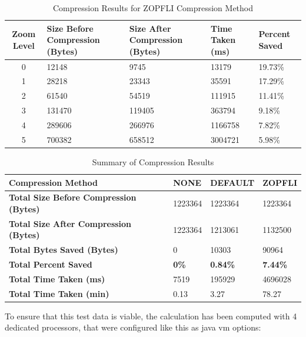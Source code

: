 \begin{table}[H]
    \centering
    \begin{tabularx}{\textwidth}{|c|X|X|X|X|}
        \hline
        \textbf{Zoom Level} & \textbf{Size Before Compression (Bytes)} & \textbf{Size After Compression (Bytes)} & \textbf{Time Taken (ms)} & \textbf{Percent Saved} \\ \hline
        0 & 12148 & 9745 & 13179 & 19.73\% \\ \hline
        1 & 28218 & 23343 & 35591 & 17.29\% \\ \hline
        2 & 61540 & 54519 & 111915 & 11.41\% \\ \hline
        3 & 131470 & 119405 & 363794 & 9.18\% \\ \hline
        4 & 289606 & 266976 & 1166758 & 7.82\% \\ \hline
        5 & 700382 & 658512 & 3004721 & 5.98\% \\ \hline
    \end{tabularx}
    \caption{Compression Results for ZOPFLI Compression Method}
    \label{tab:compression_zopfli}
\end{table}

\begin{table}[H]
    \centering
    \begin{tabular}{|p{7cm}|p{2.1cm}|p{2.1cm}|p{2.1cm}|}
        \hline
        \textbf{Compression Method} & \textbf{NONE} & \textbf{DEFAULT} & \textbf{ZOPFLI} \\ \hline
        \textbf{Total Size Before Compression (Bytes)} & 1223364 & 1223364 & 1223364 \\ \hline
        \textbf{Total Size After Compression (Bytes)} & 1223364 & 1213061 & 1132500 \\ \hline
        \textbf{Total Bytes Saved (Bytes)} & 0 & 10303 & 90964 \\ \hline
        \textbf{Total Percent Saved} & \textbf{0\%} & \textbf{0.84\%} & \textbf{7.44\%} \\ \hline
        \textbf{Total Time Taken (ms)} & 7519 & 195929 & 4696028 \\ \hline
        \textbf{Total Time Taken (min)} & 0.13 & 3.27 & 78.27 \\ \hline
    \end{tabular}
    \caption{Summary of Compression Results}
    \label{tab:summary_compression}
\end{table}

To ensure that this test data is viable, the calculation has been computed with 4 dedicated processors, that were configured like this as java vm options:

